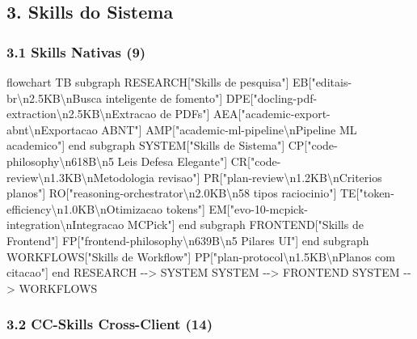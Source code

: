 \documentclass[
  12pt,
]{article}
\newenvironment{Shaded}{}{}
\newcommand{\NormalTok}[1]{#1}
\begin{document}
\subsection{3. Skills do Sistema}\label{skills-do-sistema}

\subsubsection{3.1 Skills Nativas (9)}\label{skills-nativas-9}

\begin{Shaded}
\begin{Highlighting}[]
\NormalTok{flowchart TB}
\NormalTok{subgraph RESEARCH["Skills de pesquisa"]}
\NormalTok{EB["editais{-}br\textbackslash{}n2.5KB\textbackslash{}nBusca inteligente de fomento"]}
\NormalTok{DPE["docling{-}pdf{-}extraction\textbackslash{}n2.5KB\textbackslash{}nExtracao de PDFs"]}
\NormalTok{AEA["academic{-}export{-}abnt\textbackslash{}nExportacao ABNT"]}
\NormalTok{AMP["academic{-}ml{-}pipeline\textbackslash{}nPipeline ML academico"]}
\NormalTok{end}
\NormalTok{subgraph SYSTEM["Skills de Sistema"]}
\NormalTok{CP["code{-}philosophy\textbackslash{}n618B\textbackslash{}n5 Leis Defesa Elegante"]}
\NormalTok{CR["code{-}review\textbackslash{}n1.3KB\textbackslash{}nMetodologia revisao"]}
\NormalTok{PR["plan{-}review\textbackslash{}n1.2KB\textbackslash{}nCriterios planos"]}
\NormalTok{RO["reasoning{-}orchestrator\textbackslash{}n2.0KB\textbackslash{}n58 tipos raciocinio"]}
\NormalTok{TE["token{-}efficiency\textbackslash{}n1.0KB\textbackslash{}nOtimizacao tokens"]}
\NormalTok{EM["evo{-}10{-}mcpick{-}integration\textbackslash{}nIntegracao MCPick"]}
\NormalTok{end}
\NormalTok{subgraph FRONTEND["Skills de Frontend"]}
\NormalTok{FP["frontend{-}philosophy\textbackslash{}n639B\textbackslash{}n5 Pilares UI"]}
\NormalTok{end}
\NormalTok{subgraph WORKFLOWS["Skills de Workflow"]}
\NormalTok{PP["plan{-}protocol\textbackslash{}n1.5KB\textbackslash{}nPlanos com citacao"]}
\NormalTok{end}
\NormalTok{RESEARCH {-}{-}\textgreater{} SYSTEM}
\NormalTok{SYSTEM {-}{-}\textgreater{} FRONTEND}
\NormalTok{SYSTEM {-}{-}\textgreater{} WORKFLOWS}
\end{Highlighting}
\end{Shaded}

\subsubsection{3.2 CC-Skills Cross-Client
(14)}\label{cc-skills-cross-client-14}
\end{document}
